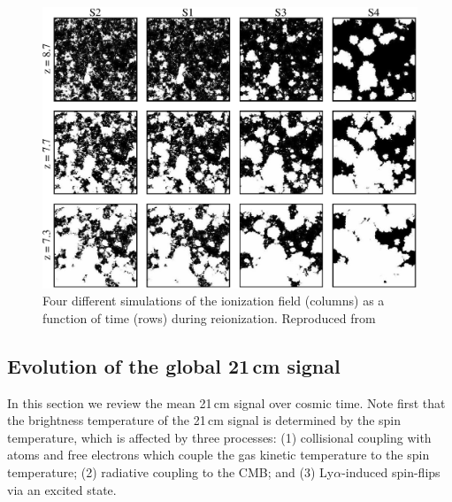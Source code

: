 \begin{figure}
	\centering
	\includegraphics[width=6in]{chap0_intro/mcquinn_ionized_region_sims.eps}
	\caption[Four different simulations of the ionization field as a function of time.]{Four different simulations of the ionization field (columns) as a function of time (rows) during reionization. Reproduced from \citet{McQuinn06}}
	\label{fig:mcquinneorsims}
\end{figure}



\subsection{Evolution of the global 21\,cm signal}
\label{sec:globalsignal}

In this section we review the mean 21\,cm signal over cosmic time. Note first that the brightness temperature of the 21\,cm signal is determined by the spin temperature, which is affected by three processes: (1) collisional coupling with atoms and free electrons which couple the gas kinetic temperature to the spin temperature; (2)  radiative coupling to the CMB; and (3) Ly$\alpha$-induced spin-flips via an excited state. 

